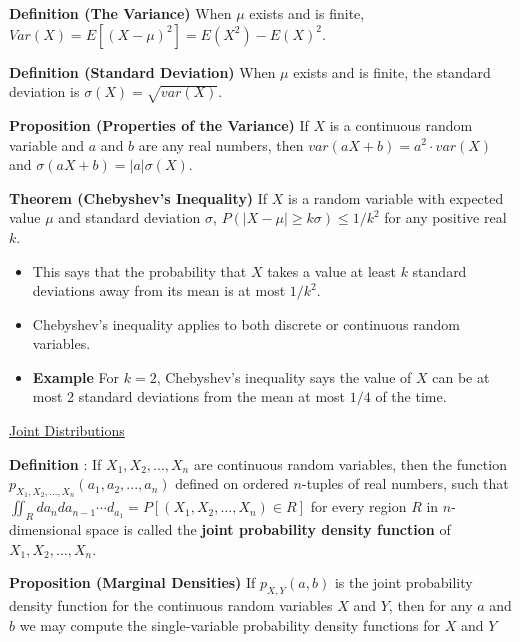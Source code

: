 \textbf{Definition (The Variance)} When $\mu$ exists and is finite, $Var(X) = E[(X - \mu)^2] = E(X^2) - E(X)^2$.

\textbf{Definition (Standard Deviation)} When $\mu$ exists and is finite, the standard deviation is $\sigma(X) = \sqrt{var(X)}$.

\textbf{Proposition (Properties of the Variance)} If $X$ is a continuous random variable and $a$ and $b$ are any real numbers, then $var(aX + b) = a^2 \cdot var(X)$ and $\sigma(aX + b) = |a|\sigma(X)$.

\textbf{Theorem (Chebyshev's Inequality)} If $X$ is a random variable with expected value $\mu$ and standard deviation $\sigma$, $P(|X - \mu| \geq k\sigma ) \leq 1 / k^2$ for any positive real $k$.

\begin{itemize}
    \item This says that the probability that $X$ takes a value at least $k$ standard deviations away from its mean is at most $1 / k^2$.
    \item Chebyshev's inequality applies to both discrete or continuous random variables.
    \item \textbf{Example} For $k = 2$, Chebyshev's inequality says the value of $X$ can be at most 2 standard deviations from the mean at most $1/4$ of the time.
\end{itemize}

\underline{Joint Distributions}

\textbf{Definition} : If $X_1, X_2, . . . , X_n$ are continuous random variables, then the function $p_{X_1,X_2,...,X_n}(a_1, a_2, . . . , a_n)$ defined on ordered $n$-tuples of real numbers, such that $\iint_R da_nda_{n-1} \cdots d_{a_1} =
P[(X_1, X_2, \ldots , X_n) \in R]$ for every region $R$ in $n$-dimensional space is called the \textbf{joint probability density function} of $X_1, X_2, \ldots , X_n$.

\textbf{Proposition (Marginal Densities)} If $p_{X, Y}(a,b)$ is the joint probability density function for the continuous random variables $X$ and $Y$, then for any $a$ and $b$ we may compute the single-variable probability density functions for $X$ and $Y$

